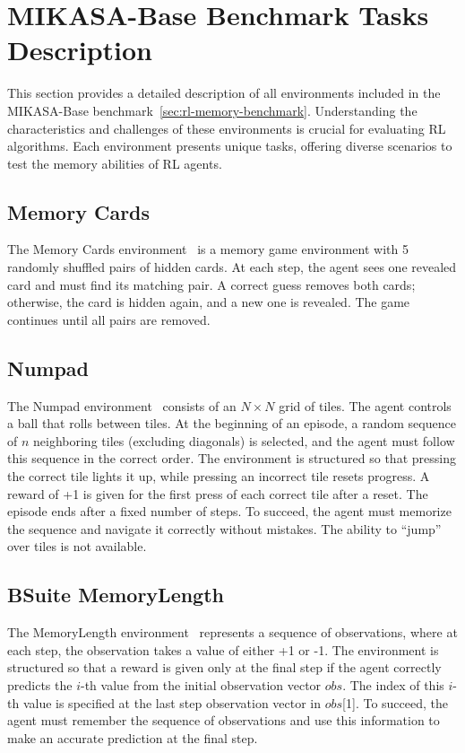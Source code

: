 \section{MIKASA-Base Benchmark Tasks Description}
\label{app:unif-memory-tasks-description}

This section provides a detailed description of all environments included in the MIKASA-Base benchmark~\autoref{sec:rl-memory-benchmark}. Understanding the characteristics and challenges of these environments is crucial for evaluating RL algorithms. Each environment presents unique tasks, offering diverse scenarios to test the memory abilities of RL agents.

\subsection{Memory Cards}

The Memory Cards environment~\citep{esslinger2022dtqn} is a memory game environment with 5 randomly shuffled pairs of hidden cards. At each step, the agent sees one revealed card and must find its matching pair. A correct guess removes both cards; otherwise, the card is hidden again, and a new one is revealed. The game continues until all pairs are removed. 

\subsection{Numpad}

The Numpad environment~\citep{humplik2019metareinforcementlearningtask} consists of an $N \times N$ grid of tiles. The agent controls a ball that rolls between tiles. At the beginning of an episode, a random sequence of $n$ neighboring tiles (excluding diagonals) is selected, and the agent must follow this sequence in the correct order. The environment is structured so that pressing the correct tile lights it up, while pressing an incorrect tile resets progress. A reward of +1 is given for the first press of each correct tile after a reset. The episode ends after a fixed number of steps. To succeed, the agent must memorize the sequence and navigate it correctly without mistakes. The ability to ``jump'' over tiles is not available.

\subsection{BSuite MemoryLength}

The MemoryLength environment~\citep{bsuite} represents a sequence of observations, where at each step, the observation takes a value of either +1 or -1. The environment is structured so that a reward is given only at the final step if the agent correctly predicts the $i$-th value from the initial observation vector $obs$. The index of this $i$-th value is specified at the last step observation vector in $obs$[1]. To succeed, the agent must remember the sequence of observations and use this information to make an accurate prediction at the final step.


